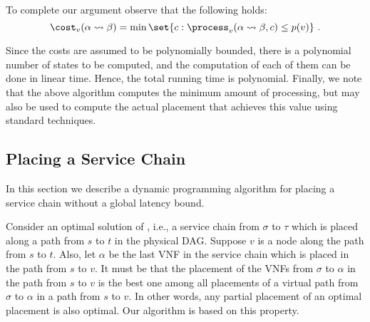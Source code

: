 To complete our argument observe that the following holds:
\[
\cost_v(\alpha \leadsto \beta)
= \min \set{c : \process_v(\alpha \leadsto \beta, c) \leq p(v)}
~.
\]

Since the costs are assumed to be polynomially bounded, there is a
polynomial number of states to be computed, and the computation of
each of them can be done in linear time.  Hence, the total running
time is polynomial.  Finally, we note that the above algorithm
computes the minimum amount of processing, but may also be used to
compute the actual placement that achieves this value using standard
techniques.


\subsection{Placing a Service Chain}

In this section we describe a dynamic programming algorithm for
placing a service chain without a global latency bound.  

Consider an optimal solution of \scp, i.e., a service chain from
$\sigma$ to $\tau$ which is placed along a path from $s$ to $t$ in the
physical DAG.  Suppose $v$ is a node along the path from $s$ to $t$.
Also, let $\alpha$ be the last VNF in the service chain which is
placed in the path from $s$ to $v$.  It must be that the placement of
the VNFs from $\sigma$ to $\alpha$ in the path from $s$ to $v$ is the
best one among all placements of a virtual path from $\sigma$ to
$\alpha$ in a path from $s$ to $v$.  In other words, any partial
placement of an optimal placement is also optimal.  Our algorithm is
based on this property.

